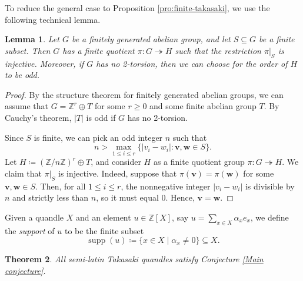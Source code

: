 \documentclass[12pt]{amsart}
\newtheorem{thm}{Theorem}[section]
\newtheorem{lem}[thm]{Lemma}
\theoremstyle{definition}
\theoremstyle{remark}
\newcommand{\Z}{\mathbb{Z}}
\newcommand{\supp}{\operatorname{supp}}
\begin{document}
To reduce the general case to Proposition \ref{pro:finite-takasaki}, we use the following technical lemma.

\begin{lem}\label{lem:takasaki}
    Let $G$ be a finitely generated abelian group, and let $S\subseteq G$ be a finite subset. Then $G$ has a finite quotient $\pi\colon G\twoheadrightarrow H$ such that the restriction $\pi|_S$ is injective. Moreover, if $G$ has no 2-torsion, then we can choose for the order of $H$ to be odd.
\end{lem}

\begin{proof}
    By the structure theorem for finitely generated abelian groups, we can assume that $G=\mathbb{Z}^r\oplus T$ for some $r\geq 0$ and some finite abelian group $T$. By Cauchy's theorem, $|T|$ is odd if $G$ has no 2-torsion. 
    
    Since $S$ is finite, we can pick an odd integer $n$ such that\[n> \max_{1\leq i\leq r}\{|v_i-w_i|: \mathbf{v},\mathbf{w}\in S\}.\] 
    Let $H\coloneq (\mathbb{Z}/n\mathbb{Z})^r\oplus T$, and consider $H$ as a finite quotient group $\pi\colon G\twoheadrightarrow H$. We claim that $\pi|_S$ is injective. Indeed, suppose that $\pi(\mathbf{v})=\pi(\mathbf{w})$ for some $\mathbf{v},\mathbf{w}\in S$. Then, for all $1\leq i\leq r$, the nonnegative integer $|v_i-w_i|$ is divisible by $n$ and strictly less than $n$, so it must equal $0$. Hence, $\mathbf{v}=\mathbf{w}$.
\end{proof}

Given a quandle $X$ and an element $u\in \Z[X]$, say $u=\sum_{x\in X}\alpha_xe_x$, we define the \emph{support} of $u$ to be the finite subset
\[
\supp(u)\coloneq\{x\in X\mid \alpha_x\neq 0\}\subseteq X.
\]

\begin{thm}\label{thm:takasaki}
    All semi-latin Takasaki quandles satisfy Conjecture \ref{Main conjecture}.
\end{thm}
\end{document}
